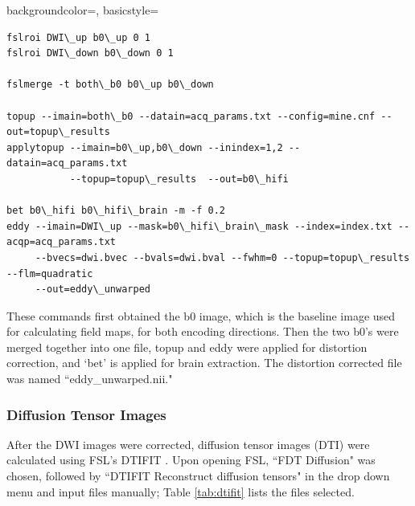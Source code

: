 {
    backgroundcolor=\color{white},
    basicstyle=\scriptsize\color{black}\ttfamily
}

\begin{lstlisting}[style=DOS]
fslroi DWI\_up b0\_up 0 1
fslroi DWI\_down b0\_down 0 1

fslmerge -t both\_b0 b0\_up b0\_down

topup --imain=both\_b0 --datain=acq_params.txt --config=mine.cnf --out=topup\_results
applytopup --imain=b0\_up,b0\_down --inindex=1,2 --datain=acq_params.txt
           --topup=topup\_results  --out=b0\_hifi

bet b0\_hifi b0\_hifi\_brain -m -f 0.2
eddy --imain=DWI\_up --mask=b0\_hifi\_brain\_mask --index=index.txt --acqp=acq_params.txt
     --bvecs=dwi.bvec --bvals=dwi.bval --fwhm=0 --topup=topup\_results --flm=quadratic
     --out=eddy\_unwarped

\end{lstlisting}

These commands first obtained the b0 image, which is the baseline image used for calculating field maps, for both encoding directions. Then the two b0's were merged together into one file, topup and eddy were applied for distortion correction, and `bet' is applied for brain extraction. The distortion corrected file was named ``eddy\_unwarped.nii."

\subsubsection{Diffusion Tensor Images}

After the DWI images were corrected, diffusion tensor images (DTI) were calculated using FSL's DTIFIT \cite{ref:dtifit}. Upon opening FSL, ``FDT Diffusion" was chosen, followed by ``DTIFIT Reconstruct diffusion tensors" in the drop down menu and input files manually; Table \ref{tab:dtifit} lists the files selected. 

